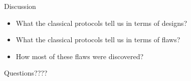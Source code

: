 \documentclass[12pt,table,xcolor={dvipsnames}]{beamer}
\begin{document}
\begin{frame}{Discussion}
\begin{itemize}
\item What the classical protocols tell us in terms of designs?\pause
\item What the classical protocols tell us in terms of flaws?\pause
\item How most of these flaws were discovered?
\end{itemize}
\end{frame}


{
\begin{frame}

{\LARGE Questions????}

\end{frame}
}
\end{document}
